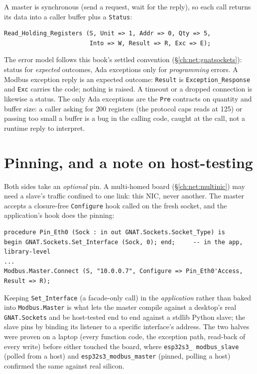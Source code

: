 A master is synchronous (send a request, wait for the reply), so each call returns
its data into a caller buffer plus a \texttt{Status}:

\begin{lstlisting}
Read_Holding_Registers (S, Unit => 1, Addr => 0, Qty => 5,
                        Into => W, Result => R, Exc => E);
\end{lstlisting}

The error model follows this book's settled convention (\S\ref{ch:net:gnatsockets}):
status for \emph{expected} outcomes, Ada exceptions only for \emph{programming} errors.
A Modbus exception reply is an expected outcome: \texttt{Result} is
\texttt{Exception\_Response} and \texttt{Exc} carries the code; nothing is raised. A
timeout or a dropped connection is likewise a status. The only Ada exceptions are the
\texttt{Pre} contracts on quantity and buffer size: a caller asking for 200 registers
(the protocol caps reads at 125) or passing too small a buffer is a bug in the calling
code, caught at the call, not a runtime reply to interpret.

\section{Pinning, and a note on host-testing}

Both sides take an \emph{optional} pin. A multi-homed board (\S\ref{ch:net:multinic})
may need a slave's traffic confined to one link: this NIC, never another. The
master accepts a closure-free \texttt{Configure} hook called on the fresh socket, and
the application's hook does the pinning:

\begin{lstlisting}
procedure Pin_Eth0 (Sock : in out GNAT.Sockets.Socket_Type) is
begin GNAT.Sockets.Set_Interface (Sock, 0); end;     -- in the app, library-level
...
Modbus.Master.Connect (S, "10.0.0.7", Configure => Pin_Eth0'Access, Result => R);
\end{lstlisting}

Keeping \texttt{Set\_Interface} (a facade-only call) in the \emph{application}
rather than baked into \texttt{Modbus.Master} is what lets the master compile against a
desktop's real \texttt{GNAT.Sockets} and be host-tested end to end against a stdlib
Python slave; the slave pins by binding its listener to a specific interface's address.
The two halves were proven on a laptop (every function code, the exception path,
read-back of every write) before either touched the board, where \texttt{esp32s3\_%
modbus\_slave} (polled from a host) and \texttt{esp32s3\_modbus\_master} (pinned, polling
a host) confirmed the same against real silicon.
